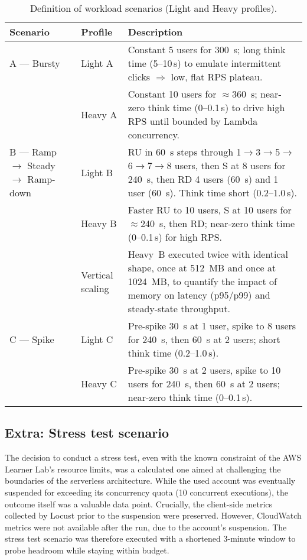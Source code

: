 \documentclass[11pt,a4paper]{article}
\begin{document}
\begin{table}[h]
\centering
\renewcommand{\arraystretch}{1.3}
\begin{tabular}{|p{2cm}|p{2cm}|p{10cm}|}
\hline
\textbf{Scenario} & \textbf{Profile} & \textbf{Description} \\
\hline

A — Bursty &
Light A &
Constant 5 users for \SI{300}{s}; long think time (5–10\,s) to emulate intermittent clicks $\Rightarrow$ low, flat RPS plateau. \\
\cline{2-3}
& Heavy A &
Constant 10 users for $\approx$\SI{360}{s}; near-zero think time (0–0.1\,s) to drive high RPS until bounded by Lambda concurrency. \\
\hline

B — Ramp $\rightarrow$ Steady $\rightarrow$ Ramp-down &
Light B &
RU in \SI{60}{s} steps through 1$\rightarrow$3$\rightarrow$5$\rightarrow$6$\rightarrow$7$\rightarrow$8 users, then S at 8 users for \SI{240}{s}, then RD 4 users (\SI{60}{s}) and 1 user (\SI{60}{s}). Think time short (0.2–1.0\,s). \\
\cline{2-3}
& Heavy B &
Faster RU to 10 users, S at 10 users for $\approx$\SI{240}{s}, then RD; near-zero think time (0–0.1\,s) for high RPS. \\
\cline{2-3}
& Vertical scaling &
Heavy~B executed twice with identical shape, once at \SI{512}{MB} and once at \SI{1024}{MB}, to quantify the impact of memory on latency (p95/p99) and steady-state throughput. \\
\hline

C — Spike &
Light C &
Pre-spike \SI{30}{s} at 1 user, spike to 8 users for \SI{240}{s}, then \SI{60}{s} at 2 users; short think time (0.2–1.0\,s). \\
\cline{2-3}
& Heavy C &
Pre-spike \SI{30}{s} at 2 users, spike to 10 users for \SI{240}{s}, then \SI{60}{s} at 2 users; near-zero think time (0–0.1\,s). \\
\hline

\end{tabular}
\caption{Definition of workload scenarios (Light and Heavy profiles).}
\end{table}

\subsection{Extra: Stress test scenario}
The decision to conduct a stress test, even with the known constraint of the AWS Learner Lab's resource limits, was a calculated one aimed at challenging the boundaries of the serverless architecture. While the used account was eventually suspended for exceeding its concurrency quota (10 concurrent executions), the outcome itself was a valuable data point. Crucially, the client-side metrics collected by Locust prior to the suspension were preserved. However, CloudWatch metrics were not available after the run, due to the account's suspension. The stress test scenario was therefore executed with a shortened 3-minute window to probe headroom while staying within budget.
\end{document}

